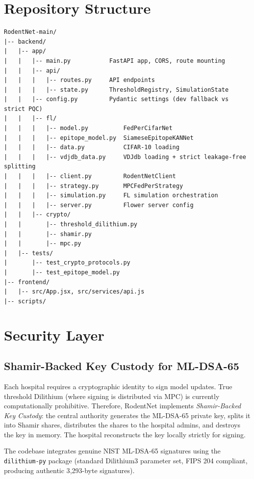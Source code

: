 \documentclass[11pt,a4paper]{article}
\begin{document}
\section{Repository Structure}

\begin{lstlisting}
RodentNet-main/
|-- backend/
|   |-- app/
|   |   |-- main.py           FastAPI app, CORS, route mounting
|   |   |-- api/
|   |   |   |-- routes.py     API endpoints
|   |   |   |-- state.py      ThresholdRegistry, SimulationState
|   |   |-- config.py         Pydantic settings (dev fallback vs strict PQC)
|   |   |-- fl/
|   |   |   |-- model.py          FedPerCifarNet
|   |   |   |-- epitope_model.py  SiameseEpitopeKANNet
|   |   |   |-- data.py           CIFAR-10 loading
|   |   |   |-- vdjdb_data.py     VDJdb loading + strict leakage-free splitting
|   |   |   |-- client.py         RodentNetClient
|   |   |   |-- strategy.py       MPCFedPerStrategy
|   |   |   |-- simulation.py     FL simulation orchestration
|   |   |   |-- server.py         Flower server config
|   |   |-- crypto/
|   |       |-- threshold_dilithium.py
|   |       |-- shamir.py
|   |       |-- mpc.py
|   |-- tests/
|       |-- test_crypto_protocols.py
|       |-- test_epitope_model.py
|-- frontend/
|   |-- src/App.jsx, src/services/api.js
|-- scripts/
\end{lstlisting}

\section{Security Layer}
\label{sec:security}

\subsection{Shamir-Backed Key Custody for ML-DSA-65}
Each hospital requires a cryptographic identity to sign model updates. True threshold Dilithium (where signing is distributed via MPC) is currently computationally prohibitive. Therefore, RodentNet implements \emph{Shamir-Backed Key Custody}: the central authority generates the ML-DSA-65 private key, splits it into Shamir shares, distributes the shares to the hospital admins, and destroys the key in memory. The hospital reconstructs the key locally strictly for signing. 

The codebase integrates genuine NIST ML-DSA-65 signatures using the \lstinline|dilithium-py| package (standard Dilithium3 parameter set, FIPS 204 compliant, producing authentic 3{,}293-byte signatures).
\end{document}
